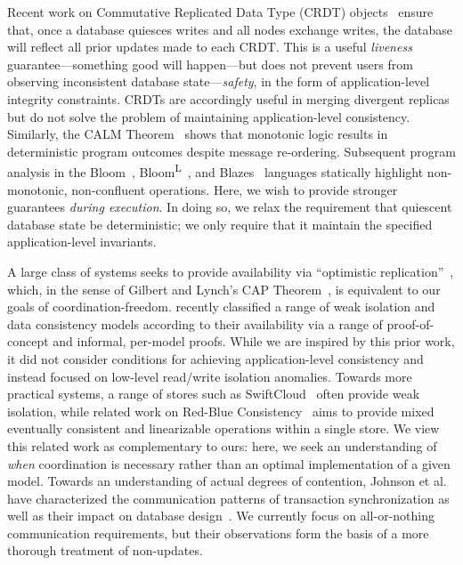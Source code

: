  Recent work on Commutative
Replicated Data Type (CRDT) objects~\cite{crdt} ensure that, once a
database quiesces writes and all nodes exchange writes, the database
will reflect all prior updates made to each CRDT. This is a useful
\textit{liveness} guarantee---something good will happen---but does
not prevent users from observing inconsistent database
state---\textit{safety}, in the form of application-level integrity
constraints. CRDTs are accordingly useful in merging divergent
replicas but do not solve the problem of maintaining application-level
consistency. Similarly, the CALM Theorem~\cite{ameloot-calm} shows
that monotonic logic results in deterministic program outcomes despite
message re-ordering. Subsequent program analysis in the
Bloom~\cite{calm}, Bloom\textsuperscript{L}~\cite{blooml}, and
Blazes~\cite{blazes} languages statically highlight non-monotonic,
non-confluent operations. Here, we wish to provide stronger guarantees
\textit{during execution}. In doing so, we relax the requirement that
quiescent database state be deterministic; we only require that it
maintain the specified application-level invariants.

 A large class of systems
seeks to provide availability via ``optimistic
replication''~\cite{optimistic}, which, in the sense of Gilbert and
Lynch's CAP Theorem~\cite{gilbert-cap}, is equivalent to our goals of
coordination-freedom. \cite{hat-vldb} recently classified a range of
weak isolation and data consistency models according to their
availability via a range of proof-of-concept and informal, per-model
proofs. While we are inspired by this prior work, it did not consider
conditions for achieving application-level consistency and instead
focused on low-level read/write isolation anomalies. Towards more
practical systems, a range of stores such as SwiftCloud~\cite{swift}
often provide weak isolation, while related work on Red-Blue
Consistency~\cite{redblue} aims to provide mixed eventually consistent
and linearizable operations within a single store. We view this
related work as complementary to ours: here, we seek an understanding
of \textit{when} coordination is necessary rather than an optimal
implementation of a given model. Towards an understanding of actual
degrees of contention, Johnson et al. have characterized the
communication patterns of transaction synchronization as well as their
impact on database design~\cite{shore-communication}. We currently
focus on all-or-nothing communication requirements, but their
observations form the basis of a more thorough treatment of
non-\iconfluent updates.

